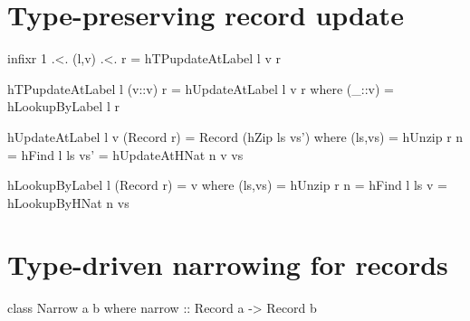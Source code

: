 





\appendix

\section{Type-preserving record update}
\label{A:hTPupdateAtLabel}


\begin{code}
 infixr 1 .<.
 (l,v) .<. r = hTPupdateAtLabel l v r
\end{code}

\begin{code}
 hTPupdateAtLabel l (v::v) r = hUpdateAtLabel l v r
  where
   (_::v) = hLookupByLabel l r
\end{code}
 
\begin{code}
 hUpdateAtLabel l v (Record r) = Record (hZip ls vs')
  where
   (ls,vs) = hUnzip r
   n       = hFind l ls
   vs'     = hUpdateAtHNat n v vs
\end{code}

\begin{code}
 hLookupByLabel l (Record r) = v
  where
   (ls,vs) = hUnzip r
   n       = hFind l ls
   v       = hLookupByHNat n vs
\end{code}






\section{Type-driven narrowing for records}
\label{A:narrow}


\begin{code}
 class  Narrow a b
  where narrow :: Record a -> Record b
\end{code}

